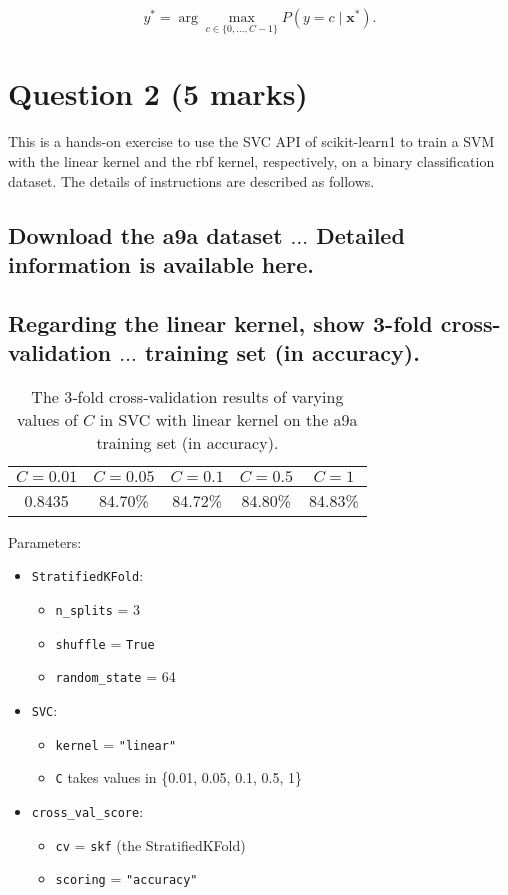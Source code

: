 \documentclass{article}
\begin{document}
\[
y^*
=
\arg\max_{c\in\{0,\dots,C-1\}}P(y=c\mid \mathbf{x}^*).
\]






\section{Question 2 (5 marks)}
This is a hands-on exercise to use the SVC API of scikit-learn1 to train a SVM with the linear kernel and the rbf kernel, respectively, on a binary classification dataset. The details of instructions are described as follows.

\bigskip
\subsection{Download the a9a dataset \(\dots\)  Detailed information is available here.}
\subsection{Regarding the linear kernel, show 3-fold cross-validation \(\dots\) training set (in accuracy).}

\begin{table}[H]
  \centering
  \caption{The 3‐fold cross‐validation results of varying values of $C$ in SVC with linear kernel on the a9a training set (in accuracy).}
  \label{tab:linear‐cv‐linear}
  \begin{tabular}{ccccc}
    \toprule
    $C=0.01$ & $C=0.05$ & $C=0.1$ & $C=0.5$ & $C=1$ \\
    \midrule
    0.8435 & 84.70\% & 84.72\% & 84.80\% & 84.83\% \\
    \bottomrule
  \end{tabular}
\end{table}

Parameters:
\begin{itemize}
  \item \texttt{StratifiedKFold}:
    \begin{itemize}
      \item \texttt{n\_splits} = 3
      \item \texttt{shuffle} = \texttt{True}
      \item \texttt{random\_state} = 64
    \end{itemize}
  \item \texttt{SVC}:
    \begin{itemize}
      \item \texttt{kernel} = \texttt{"linear"}
      \item \texttt{C} takes values in \{0.01, 0.05, 0.1, 0.5, 1\}
    \end{itemize}
  \item \texttt{cross\_val\_score}:
    \begin{itemize}
      \item \texttt{cv} = \texttt{skf} (the StratifiedKFold)
      \item \texttt{scoring} = \texttt{"accuracy"}
    \end{itemize}
\end{itemize}
\end{document}
